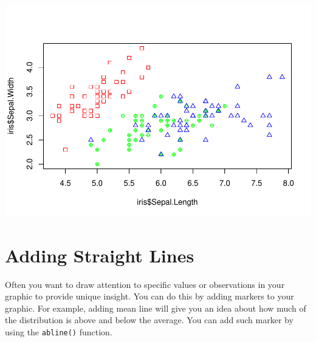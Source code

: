 \documentclass[
]{book}
\newenvironment{Shaded}{\begin{snugshade}}{\end{snugshade}}
\newcommand{\CommentTok}[1]{\textcolor[rgb]{0.56,0.35,0.01}{\textit{#1}}}
\newcommand{\DataTypeTok}[1]{\textcolor[rgb]{0.13,0.29,0.53}{#1}}
\newcommand{\DecValTok}[1]{\textcolor[rgb]{0.00,0.00,0.81}{#1}}
\newcommand{\KeywordTok}[1]{\textcolor[rgb]{0.13,0.29,0.53}{\textbf{#1}}}
\newcommand{\NormalTok}[1]{#1}
\newcommand{\OperatorTok}[1]{\textcolor[rgb]{0.81,0.36,0.00}{\textbf{#1}}}
\newcommand{\StringTok}[1]{\textcolor[rgb]{0.31,0.60,0.02}{#1}}
\begin{document}
\includegraphics{_main_files/figure-latex/unnamed-chunk-185-1.pdf}

\hypertarget{adding-straight-lines}{%
\section{Adding Straight Lines}\label{adding-straight-lines}}

Often you want to draw attention to specific values or observations in your graphic to provide unique insight. You can do this by adding markers to your graphic. For example, adding mean line will give you an idea about how much of the distribution is above and below the average. You can add such marker by using the \texttt{abline()} function.

\begin{Shaded}
\end{Shaded}
\end{document}
